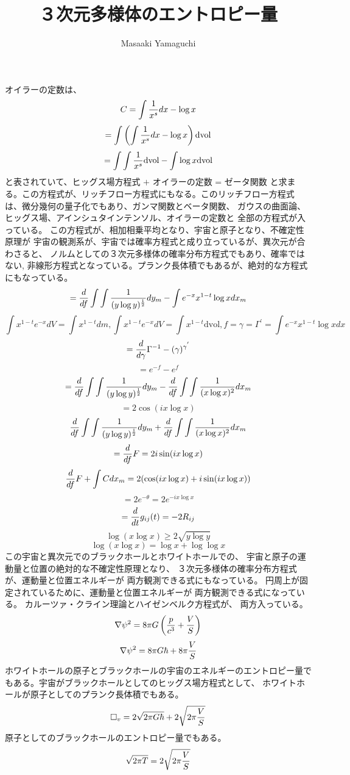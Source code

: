 \documentclass{jsarticle}
\begin{document}
\title{３次元多様体のエントロピー量}
\author{Masaaki Yamaguchi}
\date{}
\maketitle

  オイラーの定数は、
  $$ C = \int {1 \over x^s}dx - \log x $$
  $$ = \int \left(\int {1 \over x^s}dx - \log x \right)\mathrm{dvol} $$
  $$ = \int \int{1 \over x^s}\mathrm{dvol} - \int  \log x \mathrm{dvol} $$
  と表されていて、$ \text{ヒッグス場方程式 + オイラーの定数 = ゼータ関数} $
  と求まる。この方程式が、リッチフロー方程式にもなる。このリッチフロー方程式
  は、微分幾何の量子化でもあり、ガンマ関数とベータ関数、
  ガウスの曲面論、ヒッグス場、アインシュタインテンソル、オイラーの定数と
  全部の方程式が入っている。
  この方程式が、相加相乗平均となり、宇宙と原子となり、不確定性原理が
  宇宙の観測系が、宇宙では確率方程式と成り立っているが、異次元が合わさると、
  ノルムとしての３次元多様体の確率分布方程式でもあり、確率ではない,
  非線形方程式となっている。プランク長体積でもあるが、絶対的な方程式
  にもなっている。
  $$ = {d \over df} \int \int{1 \over (y \log y)^{1 \over 2}}dy_m 
  - \int e^{-x}x^{1 - t} \log x dx_m $$
  $$ \int x^{1 - t}e^{-x}dV = \int x^{1 - t}dm, \int x^{1 - t}e^{-x}dV
  = \int x^{1 - t}\mathrm{dvol}, f = \gamma = \Gamma^{'} = \int 
  e^{-x}x^{1 - t} \log x dx $$
  $$ = {d \over d \gamma}\Gamma^{-1} - (\gamma)^{\gamma^{'}} $$
  $$ = e^{-f} - e^{f} $$
  $$ = {d \over df}\int \int{1 \over (y \log y)^{1 \over 2}}dy_m
  - {d \over df}\int\int {1 \over (x \log x)^2}dx_m $$
  $$ = 2 \cos (i x \log x) $$
  $$  {d \over df}\int\int{1 \over (y \log y)^{1 \over 2}}dy_m
  + {d \over df}\int\int{1 \over (x \log x)^2}dx_m $$
  $$ = {d \over df}F = 2 i \sin (i x \log x) $$
  $$ {d \over df}F + \int C dx_m  
  = 2 (\cos( i x \log x) + i \sin(i x \log x)) $$
  $$ = 2 e^{- \theta} = 2 e^{- i x \log x} $$
  $$ = {d \over dt}g_{ij}(t) = - 2 R_{ij} $$
  $$ \log (x \log x) \ge 2 \sqrt{y \log y} $$
  $$ \log(x \log x) = \log x + \log \log x $$
  この宇宙と異次元でのブラックホールとホワイトホールでの、
  宇宙と原子の運動量と位置の絶対的な不確定性原理となり、
  ３次元多様体の確率分布方程式が、運動量と位置エネルギーが
  両方観測できる式にもなっている。
  円周上が固定されているために、運動量と位置エネルギーが
  両方観測できる式になっている。
  カルーツァ・クライン理論とハイゼンベルク方程式が、
  両方入っている。
  $$ \nabla \psi^2 = 8 \pi G\left({p \over c^3} + {V \over S}\right) $$
  $$ \nabla \psi^2 = 8 \pi G \hbar + 8 \pi {V \over S} $$
  ホワイトホールの原子とブラックホールの宇宙のエネルギーのエントロピー量で
  もある。宇宙がブラックホールとしてのヒッグス場方程式として、
  ホワイトホールが原子としてのプランク長体積でもある。
  $$ \square_v = 2 \sqrt{2 \pi G \hbar} + 2 \sqrt{2 \pi {V \over S}} $$
  原子としてのブラックホールのエントロピー量でもある。
  $$ \sqrt{2 \pi T} = 2 \sqrt{2 \pi{V \over S}} $$
\end{document}
